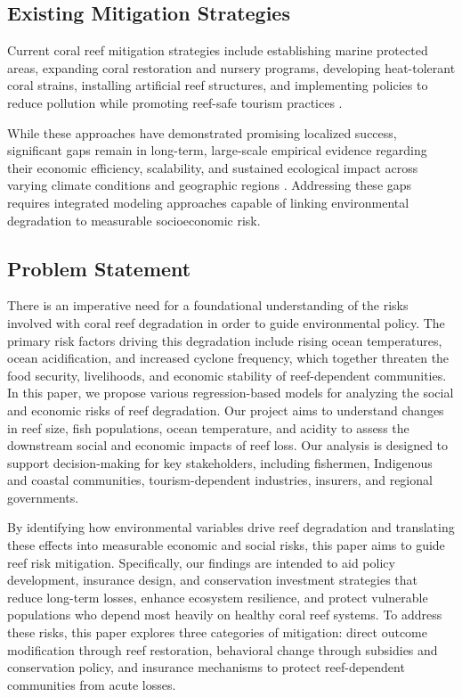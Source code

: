 \documentclass[10pt,letterpaper]{article}
\newcounter{gs}
\begin{document}
\subsection{Existing Mitigation Strategies}

Current coral reef mitigation strategies include establishing marine protected areas, expanding coral restoration and nursery programs, developing heat-tolerant coral strains, installing artificial reef structures, and implementing policies to reduce pollution while promoting reef-safe tourism practices \cite{cesar_beukering_2004}.

While these approaches have demonstrated promising localized success, significant gaps remain in long-term, large-scale empirical evidence regarding their economic efficiency, scalability, and sustained ecological impact across varying climate conditions and geographic regions \cite{burke_reefs_risk_2011}. Addressing these gaps requires integrated modeling approaches capable of linking environmental degradation to measurable socioeconomic risk.

\subsection{Problem Statement}

There is an imperative need for a foundational understanding of the risks involved with coral reef degradation in order to guide environmental policy. The primary risk factors driving this degradation include rising ocean temperatures, ocean acidification, and increased cyclone frequency, which together threaten the food security, livelihoods, and economic stability of reef-dependent communities. In this paper, we propose various regression-based models for analyzing the social and economic risks of reef degradation. Our project aims to understand changes in reef size, fish populations, ocean temperature, and acidity to assess the downstream social and economic impacts of reef loss. Our analysis is designed to support decision-making for key stakeholders, including fishermen, Indigenous and coastal communities, tourism-dependent industries, insurers, and regional governments.

By identifying how environmental variables drive reef degradation and translating these effects into measurable economic and social risks, this paper aims to guide reef risk mitigation. Specifically, our findings are intended to aid policy development, insurance design, and conservation investment strategies that reduce long-term losses, enhance ecosystem resilience, and protect vulnerable populations who depend most heavily on healthy coral reef systems. To address these risks, this paper explores three categories of mitigation: direct outcome modification through reef restoration, behavioral change through subsidies and conservation policy, and insurance mechanisms to protect reef-dependent communities from acute losses.
\end{document}
